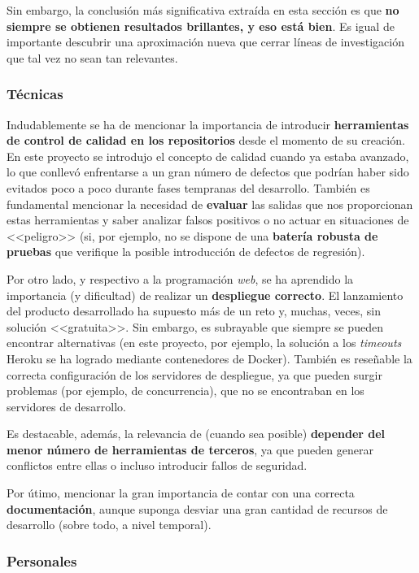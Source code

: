 Sin embargo, la conclusión más significativa extraída en esta sección es que \textbf{no siempre se obtienen resultados brillantes, y eso está bien}. Es igual de importante descubrir una aproximación nueva que cerrar líneas de investigación que tal vez no sean tan relevantes.

\subsubsection{Técnicas}

Indudablemente se ha de mencionar la importancia de introducir \textbf{herramientas de control de calidad en los repositorios} desde el momento de su creación. En este proyecto se introdujo el concepto de calidad cuando ya estaba avanzado, lo que conllevó enfrentarse a un gran número de defectos que podrían haber sido evitados poco a poco durante fases tempranas del desarrollo. También es fundamental mencionar la necesidad de \textbf{evaluar} las salidas que nos proporcionan estas herramientas y saber analizar falsos positivos o no actuar en situaciones de <<peligro>> (si, por ejemplo, no se dispone de una \textbf{batería robusta de pruebas} que verifique la posible introducción de defectos de regresión).

Por otro lado, y respectivo a la programación \textit{web}, se ha aprendido la importancia (y dificultad) de realizar un \textbf{despliegue correcto}. El lanzamiento del producto desarrollado ha supuesto más de un reto y, muchas, veces, sin solución <<gratuita>>. Sin embargo, es subrayable que siempre se pueden encontrar alternativas (en este proyecto, por ejemplo, la solución a los \textit{timeouts} Heroku se ha logrado mediante contenedores de Docker). También es reseñable la correcta configuración de los servidores de despliegue, ya que pueden surgir problemas (por ejemplo, de concurrencia), que no se encontraban en los servidores de desarrollo.

Es destacable, además, la relevancia de (cuando sea posible) \textbf{depender del menor número de herramientas de terceros}, ya que pueden generar conflictos entre ellas o incluso introducir fallos de seguridad.

Por útimo, mencionar la gran importancia de contar con una correcta \textbf{documentación}, aunque suponga desviar una gran cantidad de recursos de desarrollo (sobre todo, a nivel temporal).

\subsubsection{Personales}

